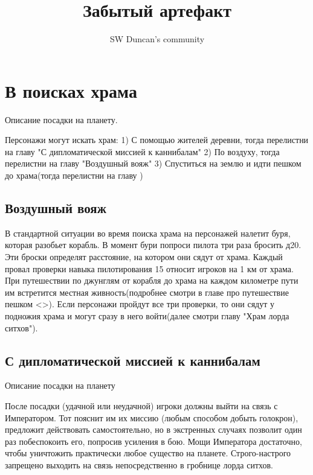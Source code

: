 \documentclass{article}
\title{Забытый артефакт}
\author{SW Duncan's community}
\begin{document}
\pagecolor{sky_black}
\BgThispage
\maketitle %
\newpage
\tableofcontents %
\newpage
\section{В поисках храма}

Описание посадки на планету.
\begin{myquote}
\color{sw}

\end{myquote}
Персонажи могут искать храм:
1) С помощью жителей деревни, тогда перелистни на главу "С дипломатической миссией к каннибалам"
2) По воздуху, тогда перелистни на главу "Воздушный вояж"
3) Спуститься на землю и идти пешком до храма(тогда перелистни на главу )
\subsection{Воздушный вояж}
В стандартной ситуации во время поиска храма на персонажей налетит буря, которая разобьет корабль.
В момент бури попроси пилота три раза бросить д20. Эти броски определят расстояние, на котором они сядут от храма.
Каждый провал проверки навыка пилотирования 15 относит игроков на 1 км от храма. При путешествии по джунглям от корабля до храма на каждом километре пути им встретится местная живность(подробнее смотри в главе про путешествие пешком <>). Если персонажи пройдут все три проверки, то они сядут у подножия храма и могут сразу в него войти(далее смотри главу "Храм лорда ситхов").

\begin{myquote}
\color{sw}

\end{myquote}
\subsection{С дипломатической миссией к каннибалам}
Описание посадки на планету
\begin{myquote}
\color{sw}

\end{myquote}
После посадки (удачной или неудачной) игроки должны выйти на связь с Императором. Тот пояснит им их миссию (любым способом добыть голокрон), предложит действовать самостоятельно, но в экстренных случаях позволит один раз побеспокоить его, попросив усиления в бою. Мощи Императора достаточно, чтобы уничтожить практически любое существо на планете. Строго-настрого запрещено выходить на связь непосредственно в гробнице лорда ситхов.
\end{document}
